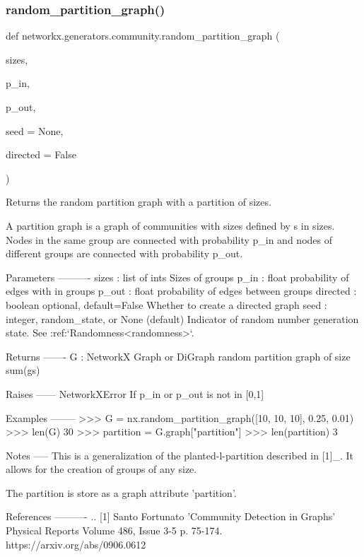\subsubsection{\texorpdfstring{random\+\_\+partition\+\_\+graph()}{random\_partition\_graph()}}
{\footnotesize\ttfamily def networkx.\+generators.\+community.\+random\+\_\+partition\+\_\+graph (\begin{DoxyParamCaption}\item[{}]{sizes,  }\item[{}]{p\+\_\+in,  }\item[{}]{p\+\_\+out,  }\item[{}]{seed = {\ttfamily None},  }\item[{}]{directed = {\ttfamily False} }\end{DoxyParamCaption})}

\begin{DoxyVerb}Returns the random partition graph with a partition of sizes.

A partition graph is a graph of communities with sizes defined by
s in sizes. Nodes in the same group are connected with probability
p_in and nodes of different groups are connected with probability
p_out.

Parameters
----------
sizes : list of ints
  Sizes of groups
p_in : float
  probability of edges with in groups
p_out : float
  probability of edges between groups
directed : boolean optional, default=False
  Whether to create a directed graph
seed : integer, random_state, or None (default)
    Indicator of random number generation state.
    See :ref:`Randomness<randomness>`.

Returns
-------
G : NetworkX Graph or DiGraph
  random partition graph of size sum(gs)

Raises
------
NetworkXError
  If p_in or p_out is not in [0,1]

Examples
--------
>>> G = nx.random_partition_graph([10, 10, 10], 0.25, 0.01)
>>> len(G)
30
>>> partition = G.graph["partition"]
>>> len(partition)
3

Notes
-----
This is a generalization of the planted-l-partition described in
[1]_.  It allows for the creation of groups of any size.

The partition is store as a graph attribute 'partition'.

References
----------
.. [1] Santo Fortunato 'Community Detection in Graphs' Physical Reports
   Volume 486, Issue 3-5 p. 75-174. https://arxiv.org/abs/0906.0612
\end{DoxyVerb}
 \mbox{\label{namespacenetworkx_1_1generators_1_1community_ad08eda5b90825de22cc1061ecb62f564}} 
